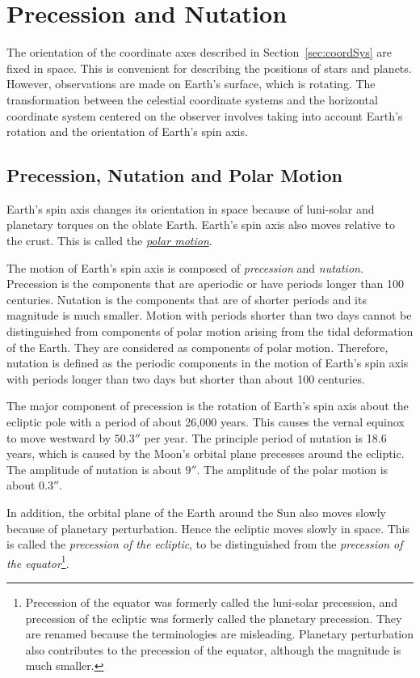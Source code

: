 \documentclass[12pt]{article}
\begin{document}
\section{Precession and Nutation}
\label{sec:precessionNutation}

The orientation of the coordinate axes described in Section~\ref{sec:coordSys} 
are fixed in space. This is convenient for describing the positions of 
stars and planets. However, observations are made on Earth's surface, which 
is rotating. The transformation between the celestial coordinate systems and 
the horizontal coordinate system centered on the observer involves taking into 
account Earth's rotation and the orientation of Earth's spin axis. 

\subsection{Precession, Nutation and Polar Motion}

Earth's spin axis changes its orientation in space because of 
luni-solar and planetary torques on the oblate Earth. 
Earth's spin axis also moves relative to the crust. This is called the 
\href{https://en.wikipedia.org/wiki/Polar_motion}{\it polar motion}. 

The motion of Earth's spin axis is composed of {\em precession} and {\em nutation}. 
Precession is the components that are aperiodic or have periods longer 
than 100 centuries. Nutation is the components that are of shorter periods 
and its magnitude is much smaller. Motion with periods shorter than two days 
cannot be distinguished from components of polar motion arising from the tidal 
deformation of the Earth. They are considered as components of polar motion. 
Therefore, nutation is defined as the periodic components in the motion of 
Earth's spin axis with periods longer than two days but shorter than about 100 centuries. 

The major component of precession is the rotation of Earth's spin axis about the 
ecliptic pole with a period of about 26,000 years. This causes the vernal equinox 
to move westward by $50.3''$ per year. The principle period of nutation 
is 18.6 years, which is caused by the Moon's orbital plane precesses around 
the ecliptic. The amplitude of nutation is about $9''$. The amplitude 
of the polar motion is about $0.3''$.

In addition, the orbital plane 
of the Earth around the Sun also moves slowly because of planetary perturbation. 
Hence the ecliptic moves slowly in space. This is called the 
{\em precession of the ecliptic}, to be distinguished from 
the {\em precession of the equator}\footnote{Precession of the equator was 
formerly called the luni-solar precession, and precession of the ecliptic 
was formerly called the planetary precession. They are renamed because the 
terminologies are misleading. Planetary perturbation also contributes to 
the precession of the equator, although the magnitude is much smaller.}. 
\end{document}
